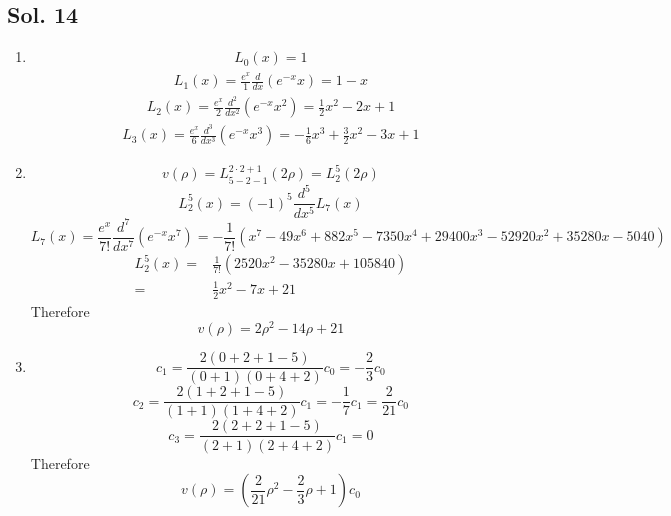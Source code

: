   \subsection*{Sol. 14}
  \begin{enumerate}
      \item 
      \begin{align*}
          L_0(x) = 1
      \end{align*}
      \begin{align*}
          L_1(x) = 
          \frac{e^x}{1}
          \frac{d}{dx}
          (e^{-x}x)
          =
          1-x
      \end{align*}
       \begin{align*}
          L_2(x) = 
          \frac{e^x}{2}
          \frac{d^2}{dx^2}
          (e^{-x}x^2)
          =
          \frac{1}{2}x^2
          -2x + 1
      \end{align*}
      \begin{align*}
          L_3(x) = 
          \frac{e^x}{6}
          \frac{d^3}{dx^3}
          (e^{-x}x^3)
          =
          -\frac{1}{6}
          x^3 
          +\frac{3}{2}x^2 
          -3x 
          + 1
      \end{align*}
      \item 
      $$
      v(\rho)
      =L^{2\cdot 2+1}_{5-2-1}
      (2\rho)
      =L^5_2(2\rho)
      $$
      $$
      L^5_2(x)
      =(-1)^5
      \frac{d^5}{dx^5}
      L_7(x)
      $$
      $$
      L_7(x)=
     \frac{e^x}{7!}
     \frac{d^7}{dx^7}
     (e^{-x}x^7)
     =
     -\frac{1}{7!}
     (x^7-49x^6+882x^5
     -7350x^4+29400x^3-52920x^2+35280x-5040)
      $$
      \begin{align*}
          L^5_2(x)
    =& \frac{1}{7!}
    (2520x^2-35280x+105840)\\
    =&
    \frac{1}{2}x^2-7x+21
      \end{align*}
      Therefore
      $$
      v(\rho)
      =2\rho^2-14\rho+21
      $$
      \item 
      $$
      c_1 = \frac{2(0+2+1-5)}{(0+1)(0+4+2)}c_0 = -\frac{2}{3}c_0
      $$
      $$
      c_2 = \frac{2(1+2+1-5)}
      {(1+1)(1+4+2)}c_1 = -\frac{1}{7}c_1=
      \frac{2}{21}c_0
      $$
      $$
      c_3 = \frac{2(2+2+1-5)}
      {(2+1)(2+4+2)}c_1 = 0
      $$
      Therefore 
      $$
      v(\rho)
      =(\frac{2}{21}\rho^2-\frac{2}{3}\rho+1)c_0
      $$
      
  \end{enumerate}

